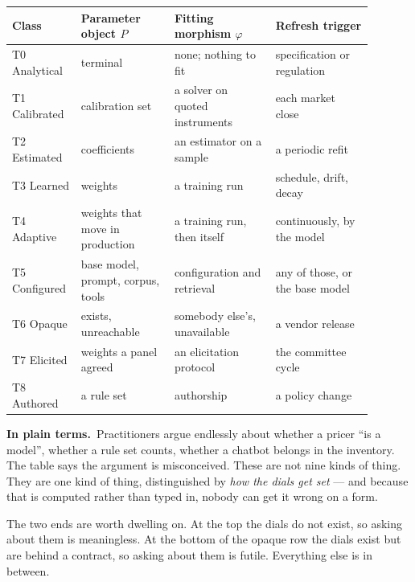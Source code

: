\documentclass[11pt,a4paper]{article}
\renewcommand{\_}{\oldunderscore\allowbreak}
\theoremstyle{plain}
\theoremstyle{definition}
\theoremstyle{definition}
\theoremstyle{remark}
\newcommand{\pt}{\textbf{In plain terms.}\ }
\begin{document}
\begin{center}
\small
\begin{tabular}{@{}L{0.14\linewidth}L{0.24\linewidth}L{0.26\linewidth}L{0.25\linewidth}@{}}
\toprule
\textbf{Class} & \textbf{Parameter object $P$} & \textbf{Fitting morphism $\varphi$} & \textbf{Refresh trigger}\\
\midrule
\textsf{T0} Analytical      & terminal                       & none; nothing to fit          & specification or regulation \\
\textsf{T1} Calibrated      & calibration set                & a solver on quoted instruments & each market close \\
\textsf{T2} Estimated       & coefficients                   & an estimator on a sample       & a periodic refit \\
\textsf{T3} Learned         & weights                        & a training run                 & schedule, drift, decay \\
\textsf{T4} Adaptive        & weights that move in production& a training run, then itself    & continuously, by the model \\
\textsf{T5} Configured      & base model, prompt, corpus, tools & configuration and retrieval  & any of those, or the base model \\
\textsf{T6} Opaque          & exists, unreachable            & somebody else's, unavailable   & a vendor release \\
\textsf{T7} Elicited        & weights a panel agreed         & an elicitation protocol        & the committee cycle \\
\textsf{T8} Authored        & a rule set                     & authorship                     & a policy change \\
\bottomrule
\end{tabular}
\end{center}

\begin{plain}
\pt Practitioners argue endlessly about whether a pricer ``is a model'', whether a rule set counts,
whether a chatbot belongs in the inventory. The table says the argument is misconceived. These are not
nine kinds of thing. They are one kind of thing, distinguished by \emph{how the dials get set} --- and
because that is computed rather than typed in, nobody can get it wrong on a form.

The two ends are worth dwelling on. At the top the dials do not exist, so asking about them is
meaningless. At the bottom of the opaque row the dials exist but are behind a contract, so asking about
them is futile. Everything else is in between.
\end{plain}
\end{document}
